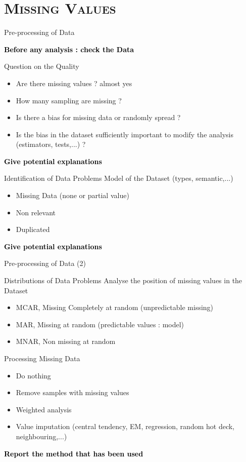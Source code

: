\documentclass[xcolor=x11names,compress,8pt,
handout
]{beamer}
\renewcommand{\(}{\begin{columns}}
\renewcommand{\)}{\end{columns}}
\newcommand{\<}[1]{\begin{column}{#1}}
\renewcommand{\>}{\end{column}}
\begin{document}
\section[{\scshape Missing Values}]{{\scshape Missing Values} }
\begin{frame}{Pre-processing of Data}
\centerline{\colorbox{yellow!85}{\textcolor{black}{\textbf{\large Before any analysis : check the Data}}}}
\begin{alertblock}{Question on the Quality}
\begin{itemize}
\item Are there missing values ?  almost yes
\item How many sampling are missing ?
\item Is there a bias for missing data or randomly spread ?
\item Is the bias in the dataset sufficiently important to modify the analysis (estimators, tests,...) ?
\end{itemize}
\centerline{\colorbox{yellow!85}{\textcolor{black}{\textbf{\large Give potential explanations}}}}
\end{alertblock}
\pause

\begin{alertblock}{Identification of Data Problems}
Model of the Dataset (types, semantic,...)
\begin{itemize}
\item Missing Data (none or partial  value)
\item Non relevant 
\item Duplicated
\end{itemize}
\centerline{\colorbox{yellow!85}{\textcolor{black}{\textbf{\large Give potential explanations}}}}
\end{alertblock}
\end{frame}
\begin{frame}{Pre-processing of Data (2)}
\begin{alertblock}{Distributions of Data Problems }
Analyse the position of missing values in the Dataset
\begin{itemize}
\item MCAR, Missing Completely at random (unpredictable missing)
\item MAR, Missing at random (predictable values : model)
\item MNAR, Non missing at random
\end{itemize}
\end{alertblock}
\pause

\begin{alertblock}{Processing Missing Data}
\begin{itemize}
\item Do nothing 
\item Remove samples with missing values
\item Weighted analysis 
\item Value imputation (central tendency, EM, regression, random hot deck, neighbouring,...)
\end{itemize}
\centerline{\colorbox{yellow!85}{\textcolor{black}{\textbf{\large Report the method that has been used}}}}

\end{alertblock}
\end{frame}
\end{document}
